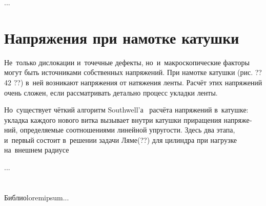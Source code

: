 \begin{otherlanguage}{russian}
...



\section{Напряжения при намотке катушки}

Не~только дислокации и~точечные дефекты, но~и~макроскопические факторы могут быть источниками собственных напряжений. При намотке катушки (рис. ?? 42 ??) в~ней возникают напряжения от натяжения ленты. Расчёт этих напряжений очень сложен, если рассматривать детально процесс укладки ленты.

Но~существует чёткий алгоритм Southwell’а~\cite{southwell-introductiontotheoryofelasticity} расчёта напряжений в~катушке: укладка каждого нового витка вызывает внутри катушки приращения напряжений, определяемые соотношениями линейной упругости. Здесь два этапа, и~первый состоит в~решении задачи Ляме(??) для цилиндра при нагрузке на~внешнем радиусе

...



\vspace{8mm}
\hfill\begin{minipage}[b]{0.95\linewidth}
\fontsize{10}{12}\selectfont

\section*{\wordforbibliography}

Библиоloremipsum...

\end{minipage}

\end{otherlanguage}
